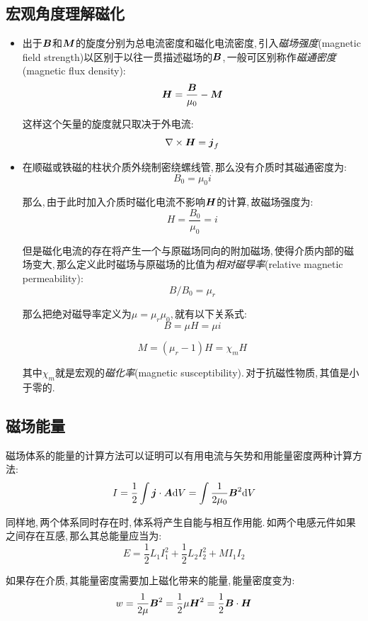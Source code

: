\subsection{宏观角度理解磁化}

\begin{itemize}
\item 出于$\boldsymbol{B}$和$\boldsymbol{M}$的旋度分别为总电流密度和磁化电流密度,\,引入\emph{磁场强度}(magnetic field strength)以区别于以往一贯描述磁场的$\boldsymbol{B}$,\,一般可区别称作\emph{磁通密度}(magnetic flux density):
\[\boldsymbol{H}=\frac{\boldsymbol{B}}{\mu_0}-\boldsymbol{M}\]

这样这个矢量的旋度就只取决于外电流:
\[\nabla\times \boldsymbol{H}=\boldsymbol{j}_f\]

\item 在顺磁或铁磁的柱状介质外绕制密绕螺线管,\,那么没有介质时其磁通密度为:
\[B_0=\mu_0 i\]

那么,\,由于此时加入介质时磁化电流不影响$\boldsymbol{H}$的计算,\,故磁场强度为:
\[H=\frac{B_0}{\mu_0}=i\]

但是磁化电流的存在将产生一个与原磁场同向的附加磁场,\,使得介质内部的磁场变大,\,那么定义此时磁场与原磁场的比值为\emph{相对磁导率}(relative magnetic permeability):
\[B/B_0=\mu_r\]

那么把绝对磁导率定义为$\mu=\mu_r\mu_0$,\,就有以下关系式:
\[B=\mu H=\mu i\]

\[M=(\mu_r-1)H=\chi_m H\]

其中$\chi_m$就是宏观的\emph{磁化率}(magnetic susceptibility).\,对于抗磁性物质,\,其值是小于零的.


\end{itemize}

\subsection{磁场能量}

磁场体系的能量的计算方法可以证明可以有用电流与矢势和用能量密度两种计算方法:
\[I=\frac{1}{2}\int \boldsymbol{j}\cdot\boldsymbol{A}\textrm{d} V=\int \frac{1}{2\mu_0}	\boldsymbol{B}^2\textrm{d} V\]

同样地,\,两个体系同时存在时,\,体系将产生自能与相互作用能.\,如两个电感元件如果之间存在互感,\,那么其总能量应当为:
\[E=\frac{1}{2}L_1I_1^2+\frac{1}{2}L_2I_2^2+ MI_1I_2\]

如果存在介质,\,其能量密度需要加上磁化带来的能量,\,能量密度变为:
\[w=\frac{1}{2\mu}	\boldsymbol{B}^2=\frac{1}{2}\mu \boldsymbol{H}^2 =\frac{1}{2}	\boldsymbol{B}\cdot \boldsymbol{H}\]

